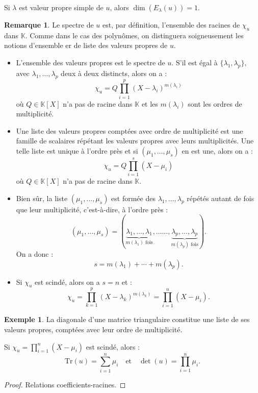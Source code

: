 \documentclass[french]{article}
\newcommand{\K}{\mathbb{K}}
\newcommand{\Tr}{\text{Tr}}
\theoremstyle{plain}
\theoremstyle{definition}
\newtheorem*{ex}{Exemple}
\newtheorem*{rmq}{Remarque}
\theoremstyle{remark}
\begin{document}
	\begin{cor}{}%
		Si $\lambda$ est valeur propre simple de $u$, alors $\dim(E_\lambda(u))=1$.
	\end{cor}
	
	\begin{rmq}
		Le spectre de $u$ est, par définition, l'ensemble des racines de $\chi_u$ dans $\K$. Comme dans le cas des polynômes, on distinguera soigneusement les notions d'ensemble er de liste des valeurs propres de $u$.
		\begin{itemize}
			\item L'ensemble des valeurs propres est le spectre de $u$. S'il est égal à $\{\lambda_1,\lambda_p\}$, avec $\lambda_1,\ldots,\lambda_p$ deux à deux distincts, alors on a : $$\chi_u=Q\prod_{i=1}^{p}(X-\lambda_i)^{m(\lambda_i)}$$ où $Q\in\K[X]$ n'a pas de racine dans $\K$ et les $m(\lambda_i)$ sont les ordres de multiplicité.
			\item Une liste des valeurs propres comptées avec ordre de multiplicité est une famille de scalaires répétant les valeurs propres avec leurs multiplicités. Une telle liste est unique à l'ordre près et si $(\mu_1,\ldots,\mu_s)$ en est une, alors on a : $$\chi_u=Q\prod_{i=1}^{s}(X-\mu_i)$$ où $Q\in\K[X]$ n'a pas de racine dans $\K$.
			\item Bien sûr, la liste $(\mu_1,\ldots,\mu_s)$ est formée des $\lambda_1,\ldots,\lambda_p$ répétés autant de fois que leur multiplicité, c'est-à-dire, à l'ordre près :
			$$(\mu_1,\ldots,\mu_s)=(\underbrace{\lambda_1,\ldots,\lambda_1}_{m(\lambda_1)\text{ fois}},\ldots\ldots,\underbrace{\lambda_p,\ldots,\lambda_p}_{m(\lambda_p)\text{ fois}}).$$
			On a donc : $$s=m(\lambda_1)+\cdots+m(\lambda_p).$$
			\item Si $\chi_u$ est scindé, alors on a $s=n$ et : $$\chi_u=\prod_{k=1}^{p}(X-\lambda_k)^{m(\lambda_k)}=\prod_{i=1}^{n}(X-\mu_i).$$
		\end{itemize}
	\end{rmq}
	
	\begin{ex}
		La diagonale d'une matrice triangulaire constitue une liste de ses valeurs propres, comptées avec leur ordre de multiplicité.
	\end{ex}
	
	\begin{prop}{}%
		Si $\chi_u=\displaystyle\prod_{i=1}^{n}(X-\mu_i)$ est scindé, alors : $$\Tr(u)=\sum_{i=1}^{n}\mu_i\quad\text{et}\quad\det(u)=\prod_{i=1}^{n}\mu_i.$$
	\end{prop}
	\begin{proof}
		Relations coefficients-racines.
	\end{proof}
	
\end{document}
